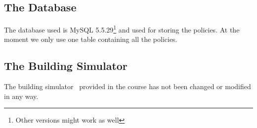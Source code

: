 \subsection{The Database}
The database used is MySQL 5.5.29\footnote{Other versions might work as well} and used for storing the policies. At the moment we only use one table containing all the policies.

\subsection{The Building Simulator}
The building simulator~\cite{simulator} provided in the course has not been changed or modified in any way.